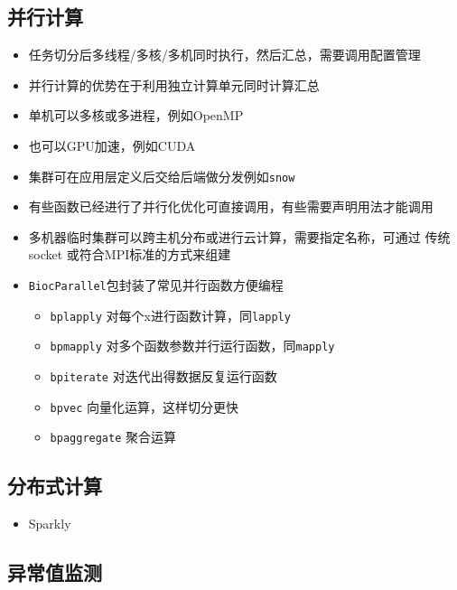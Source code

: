 \documentclass[]{book}
\providecommand{\tightlist}{%
  \setlength{\itemsep}{0pt}\setlength{\parskip}{0pt}}
\begin{document}
\hypertarget{ux5e76ux884cux8ba1ux7b97}{%
\subsection{并行计算}\label{ux5e76ux884cux8ba1ux7b97}}

\begin{itemize}
\tightlist
\item
  任务切分后多线程/多核/多机同时执行，然后汇总，需要调用配置管理
\item
  并行计算的优势在于利用独立计算单元同时计算汇总
\item
  单机可以多核或多进程，例如OpenMP
\item
  也可以GPU加速，例如CUDA
\item
  集群可在应用层定义后交给后端做分发例如\texttt{snow}
\item
  有些函数已经进行了并行化优化可直接调用，有些需要声明用法才能调用
\item
  多机器临时集群可以跨主机分布或进行云计算，需要指定名称，可通过 传统 socket 或符合MPI标准的方式来组建
\item
  \texttt{BiocParallel}包封装了常见并行函数方便编程

  \begin{itemize}
  \tightlist
  \item
    \texttt{bplapply} 对每个x进行函数计算，同\texttt{lapply}
  \item
    \texttt{bpmapply} 对多个函数参数并行运行函数，同\texttt{mapply}
  \item
    \texttt{bpiterate} 对迭代出得数据反复运行函数
  \item
    \texttt{bpvec} 向量化运算，这样切分更快
  \item
    \texttt{bpaggregate} 聚合运算
  \end{itemize}
\end{itemize}

\hypertarget{ux5206ux5e03ux5f0fux8ba1ux7b97}{%
\subsection{分布式计算}\label{ux5206ux5e03ux5f0fux8ba1ux7b97}}

\begin{itemize}
\tightlist
\item
  Sparkly
\end{itemize}

\hypertarget{ux5f02ux5e38ux503cux76d1ux6d4b}{%
\subsection{异常值监测}\label{ux5f02ux5e38ux503cux76d1ux6d4b}}
\end{document}
